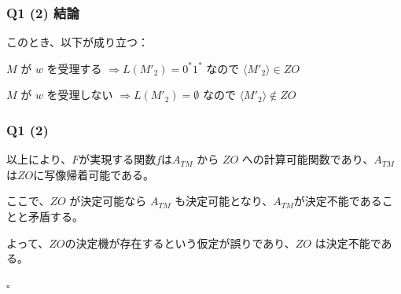 \begin{frame}[fragile]
\frametitle{Q1 (2) 結論}

このとき、以下が成り立つ：

$M \text{ が } w \text{ を受理する } \Longrightarrow  L(M'_2) = 0^*1^*$ なので $\langle M'_2 \rangle \in ZO$

$M \text{ が } w \text{ を受理しない } \Longrightarrow  L(M'_2) = \emptyset$ なので $\langle M'_2 \rangle \notin ZO$

\end{frame}

\begin{frame}[fragile]
\frametitle{Q1 (2)}

以上により、$F$が実現する関数$f$は$A_{TM}$ から $ZO$ への計算可能関数であり、$A_{TM}$は$ZO$に写像帰着可能である。

ここで、$ZO$ が決定可能なら $A_{TM}$ も決定可能となり、$A_{TM}$が決定不能であることと矛盾する。

よって、$ZO$の決定機が存在するという仮定が誤りであり、$ZO$ は決定不能である。

\hfill $\square$


\end{frame}



